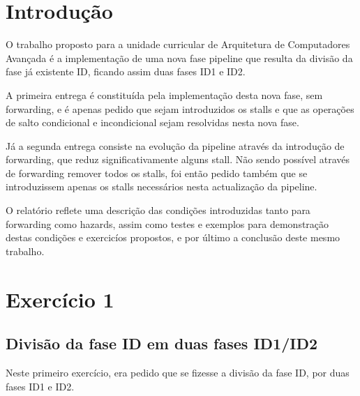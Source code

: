 \documentclass[pdftex,12pt,a4paper]{report}
\begin{document}
\renewcommand{\headrulewidth}{0pt}

\fancyhead{}
\fancyfoot{}
\rfoot{\thepage}

\renewcommand*\contentsname{Conteúdos}
\renewcommand*\figurename{Figura}
\renewcommand*\tablename{Tabela}

\tableofcontents
\renewcommand{\headrulewidth}{0.15pt}
\renewcommand{\thechapter}{}

\clearpage

\section{Introdução}

O trabalho proposto para a unidade curricular de Arquitetura de Computadores Avançada é a implementação de uma nova fase pipeline que resulta da divisão da fase já existente ID, ficando assim duas fases ID1 e ID2.

A primeira entrega é constituída pela implementação desta nova fase, sem forwarding, e é apenas pedido que sejam introduzidos os stalls e que as operações de salto condicional e incondicional sejam resolvidas nesta nova fase.

Já a segunda entrega consiste na evolução da pipeline através da introdução de forwarding, que reduz significativamente alguns stall. Não sendo possível através de forwarding remover todos os stalls, foi então pedido também que se introduzissem apenas os stalls necessários nesta actualização da pipeline.

O relatório reflete uma descrição das condições introduzidas tanto para forwarding como hazards, assim como testes e exemplos para demonstração destas condições e exercicíos propostos, e por último a conclusão deste mesmo trabalho.

\newpage
\section{Exercício 1}

\subsection{Divisão da fase ID em duas fases ID1/ID2}
Neste primeiro exercício, era pedido que se fizesse a divisão da fase ID, por duas fases ID1 e ID2.
\end{document}
